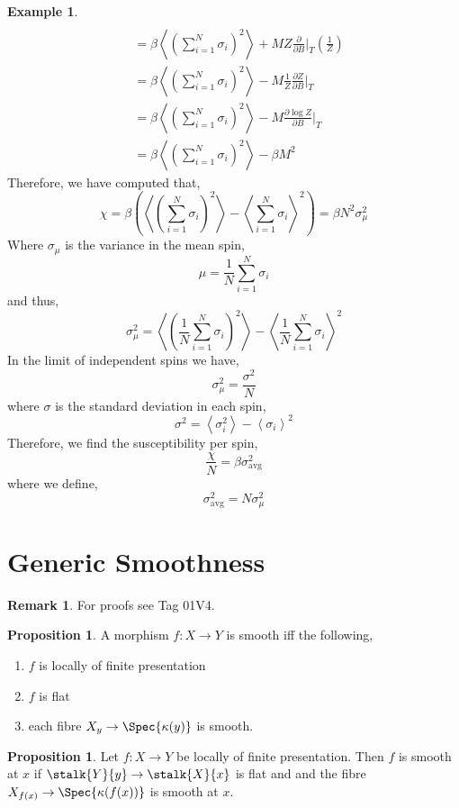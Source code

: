 \documentclass[12pt]{extarticle}
\newcommand{\pderiv}[2]{\frac{\partial{#1}}{\partial{#2}}}
\theoremstyle{definition}
\newtheorem{proposition}[theorem]{Proposition}
\newtheorem{example}[theorem]{Example}
\newtheorem{remark}{Remark}
\newcommand{\A}{\mathbb{A}}
\begin{document}
\begin{example}
\begin{align*}
\\
& = \beta \left< \left( \sum_{i = 1}^N \sigma_i \right)^2 \right> + M Z \pderiv{}{B} \bigg|_T \left( \frac{1}{Z} \right)
\\
& = \beta \left<  \left( \sum_{i = 1}^N \sigma_i \right)^2 \right> - M \frac{1}{Z} \pderiv{Z}{B} \bigg|_T 
\\
& = \beta \left<  \left( \sum_{i = 1}^N \sigma_i \right)^2 \right> - M \pderiv{\log{Z}}{B} \bigg|_T 
\\
& = \beta \left< \left( \sum_{i = 1}^N \sigma_i \right)^2 \right> - \beta M^2
\end{align*}
Therefore, we have computed that,
\[ \chi = \beta \left( \left< \left( \sum_{i = 1}^N \sigma_i \right)^2 \right> - \left<  \sum_{i = 1}^N \sigma_i \right>^2 \right) = \beta N^2 \sigma^2_{\mu} \]
Where $\sigma_\mu$ is the variance in the mean spin,
\[ \mu =  \frac{1}{N}  \sum_{i = 1}^N \sigma_i \]
and thus,
\[ \sigma_\mu^2 = \left< \left( \frac{1}{N} \sum_{i = 1}^N \sigma_i \right)^2 \right> - \left< \frac{1}{N} \sum_{i = 1}^N \sigma_i  \right>^2 \]
In the limit of independent spins we have,
\[ \sigma_\mu^2 = \frac{\sigma^2}{N} \]
where $\sigma$ is the standard deviation in each spin,
\[ \sigma^2 = \left< \sigma_i^2 \right> - \left< \sigma_i \right>^2 \]
Therefore, we find the susceptibility per spin,
\[ \frac{\chi}{N} = \beta \sigma_{\text{avg}}^2 \]
where we define,
\[ \sigma_{\text{avg}}^2 = N \sigma_\mu^2 \]
\end{example}


\section{Generic Smoothness}

\renewcommand{\A}{\mathbb{A}}

\begin{remark}
For proofs see Tag 01V4.
\end{remark}

\begin{proposition}
A morphism $f : X \to Y$ is smooth iff the following,
\begin{enumerate}
\item $f$ is locally of finite presentation
\item $f$ is flat
\item each fibre $X_y \to \Spec{\kappa(y)}$ is smooth.
\end{enumerate} 
\end{proposition}

\begin{proposition}
Let $f : X \to Y$ be locally of finite presentation. Then $f$ is smooth at $x$ if $\stalk{Y}{y} \to \stalk{X}{x}$ is flat and and the fibre $X_{f(x)} \to \Spec{\kappa(f(x))}$ is smooth at $x$.  
\end{proposition}
\end{document}
